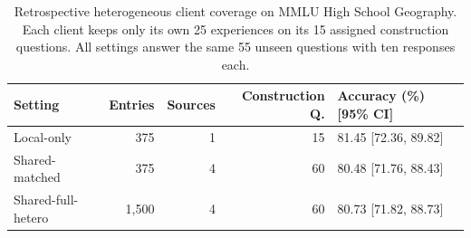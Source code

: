 \begin{table}[t]
    \centering
    \caption{Retrospective heterogeneous client coverage on MMLU High School Geography.
    Each client keeps only its own 25 experiences on its 15 assigned construction questions.
    All settings answer the same 55 unseen questions with ten responses each.}
    \label{tab:hetero_sharing}
    \footnotesize
    \setlength{\tabcolsep}{3pt}
    \renewcommand{\arraystretch}{1.1}
    \begin{tabular}{lrrrl}
        \hline
        Setting & Entries & Sources & Construction Q. & Accuracy (\%) [95\% CI] \\
        \hline
        Local-only & 375 & 1 & 15 & 81.45 [72.36, 89.82] \\
        Shared-matched & 375 & 4 & 60 & 80.48 [71.76, 88.43] \\
        Shared-full-hetero & 1,500 & 4 & 60 & 80.73 [71.82, 88.73] \\
        \hline
    \end{tabular}
\end{table}
